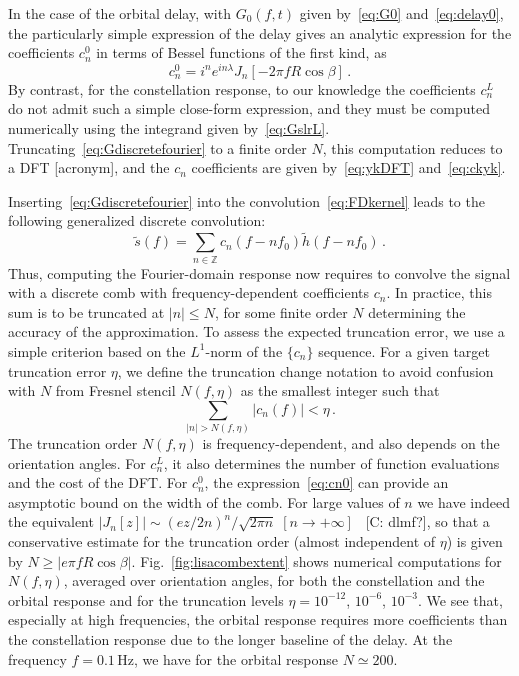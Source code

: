 \documentclass[aps,showpacs,twocolumn,
prd,superscriptaddress,nofootinbib]{revtex4-1}
\newcommand{\be}{\begin{equation}}
\newcommand{\ee}{\end{equation}}
\newcommand{\Hz}{\,\mathrm{Hz}}
\newcommand{\SM}[1]{{\color{Red} #1}}
\begin{document}
In the case of the orbital delay, with $G_{0}(f,t)$ given by~\eqref{eq:G0} and~\eqref{eq:delay0}, the particularly simple expression of the delay gives an analytic expression for the coefficients $c_{n}^{0}$ in terms of Bessel functions of the first kind, as
\be\label{eq:cn0}
	c_{n}^{0} = i^{n} e^{i n \lambda} J_{n} \left[ -2 \pi f R \cos \beta \right]\,.
\ee
By contrast, for the constellation response, to our knowledge the coefficients $c_{n}^{L}$ do not admit such a simple close-form expression, and they must be computed numerically using the integrand given by~\eqref{eq:GslrL}. Truncating~\eqref{eq:Gdiscretefourier} to a finite order $N$, this computation reduces to a DFT \SM{[acronym]}, and the $c_{n}$ coefficients are given by~\eqref{eq:ykDFT} and~\eqref{eq:ckyk}. 

Inserting~\eqref{eq:Gdiscretefourier} into the convolution~\eqref{eq:FDkernel} leads to the following generalized discrete convolution:
\be\label{eq:transferdiscreteconvolution}
	\tilde{s}(f) = \sum_{n \in \mathbb{Z}} c_{n}(f - n f_{0}) \tilde{h} (f - n f_{0}) \,.
\ee
Thus, computing the Fourier-domain response now requires to convolve the signal with a discrete comb with frequency-dependent coefficients $c_{n}$. In practice, this sum is to be truncated at $|n|\leq N$, for some finite order $N$ determining the accuracy of the approximation. To assess the expected truncation error, we use a simple criterion based on the $L^{1}$-norm of the $\{c_{n}\}$ sequence. For a given target truncation error $\eta$, we define the truncation \SM{change notation to avoid confusion with $N$ from Fresnel stencil} $N(f, \eta)$ as the smallest integer such that 
\be\label{eq:criteriontruncationcomb}
	\sum_{|n| > N(f, \eta)} |c_{n}(f)| < \eta \,.
\ee
The truncation order $N(f,\eta)$ is frequency-dependent, and also depends on the orientation angles. For $c_{n}^{L}$, it also determines the number of function evaluations and the cost of the DFT. For $c_{n}^{0}$, the expression~\eqref{eq:cn0} can provide an asymptotic bound on the width of the comb. For large values of $n$ we have indeed the equivalent $| J_{n}[z] | \sim (e z/2n)^{n}/\sqrt{2\pi n} \; \left[ n\rightarrow + \infty \right]$~\cite{} \SM{[C: dlmf?]}, so that a conservative estimate for the truncation order (almost independent of $\eta$) is given by $N \geq  |e \pi f R \cos \beta|$. Fig.~\ref{fig:lisacombextent} shows numerical computations for $N(f,\eta)$, averaged over orientation angles, for both the constellation and the orbital response and for the truncation levels  $\eta=10^{-12}$, $10^{-6}$, $10^{-3}$. We see that, especially at high frequencies, the orbital response requires more coefficients than the constellation response due to the longer baseline of the delay. At the frequency $f=0.1\Hz$, we have for the orbital response $N \simeq 200$.
\end{document}
